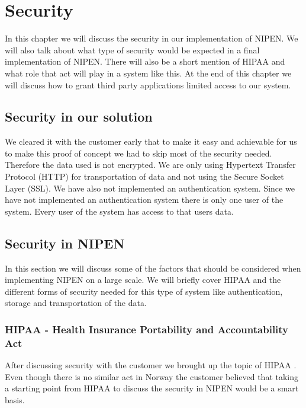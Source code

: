 \chapter{Security} 
\label{ch:security}


In this chapter we will discuss the security in our implementation of NIPEN.
We will also talk about what type of security would be expected in a final implementation of NIPEN. There will also be a short mention of HIPAA and what role that act will play in a system like this.
At the end of this chapter we will discuss how to grant third party applications limited access to our system.

\section{Security in our solution}
We cleared it with the customer early that to make it easy and achievable for us to make this proof of concept we had to skip most of the security needed.
Therefore the data used is not encrypted. 
We are only using Hypertext Transfer Protocol (HTTP) for transportation of data and not using the Secure Socket Layer (SSL).  
We have also not implemented an authentication system.
Since we have not implemented an authentication system there is only one user of the system.
Every user of the system has access to that users data.

\section{Security in NIPEN}

In this section we will discuss some of the factors that should be considered when implementing NIPEN on a large scale.
We will briefly cover HIPAA and the different forms of security needed for this type of system like authentication, storage and transportation of the data.


\subsection{HIPAA - Health Insurance Portability and Accountability Act}

After discussing security with the customer we brought up the topic of HIPAA \cite{HIPAA}. 
Even though there is no similar act in Norway the customer believed that taking a starting point from HIPAA to discuss the security in NIPEN would be a smart basis. 

